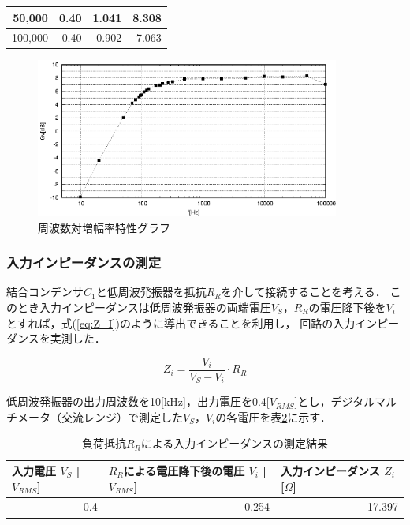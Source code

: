 \documentclass[dvipdfmx,titlepage,a4j]{jsarticle}  %
\numberwithin{equation}{section}
\begin{document}
\begin{table}[H]
\begin{center}
\begin{tabular}{r|r|r|r}
      50,000                                   & 0.40                                            & 1.041                                     & 8.308                                  \\ \hline
      100,000                                  & 0.40                                            & 0.902                                     & 7.063                                  \\ \hline
    \end{tabular}
  \end{center}
  \label{tbl:res;f-gain}
\end{table}

\begin{figure}[H]
  \centering
  \includegraphics[width=10cm]{../gnuplot/f-gv.eps}
  \caption{周波数対増幅率特性グラフ}
  \label{fig:f-gv.eps}
\end{figure}

\subsubsection{入力インピーダンスの測定}
結合コンデンサ$C_1$と低周波発振器を抵抗$R_R$を介して接続することを考える．
このとき入力インピーダンスは低周波発振器の両端電圧$V_S$，$R_R$の電圧降下後を$V_i$とすれば，式(\ref{eq:Z_I})のように導出できることを利用し，
回路の入力インピーダンスを実測した．

\begin{equation}
  Z_i = \frac{V_i}{V_S - V_i} \cdot R_R
  \label{eq:Z_I}
\end{equation}

低周波発振器の出力周波数を10[kHz]，出力電圧を0.4[$V_{RMS}$]とし，デジタルマルチメータ（交流レンジ）で測定した$V_S$，$V_i$の各電圧を表\ref{tbl:res;Z_I}に示す．

\begin{table}[H]
  \caption{負荷抵抗$R_R$による入力インピーダンスの測定結果}
  \begin{center}
    \begin{tabular}{l|l|l}
      \hline
      入力電圧 $V_S$ [$V_{RMS}$] & $R_R$による電圧降下後の電圧 $V_i$ [$V_{RMS}$] & 入力インピーダンス $Z_i$ [$\Omega$] \\ \hline\hline
      \multicolumn{1}{r|}{0.4}   & \multicolumn{1}{r|}{0.254}                    & \multicolumn{1}{r}{17.397}          \\ \hline
    \end{tabular}
  \end{center}
  \label{tbl:res;Z_I}
\end{table}
\end{document}
